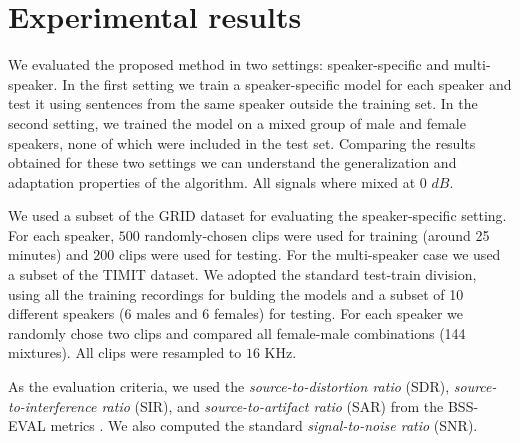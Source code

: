 \section{Experimental results}
\label{sec:experiments}


 We evaluated the proposed method in two settings: speaker-specific and multi-speaker. In the first setting 
we train a speaker-specific model for each speaker and test it using sentences from the same speaker outside the training set. 
In the second setting, we trained the model on a mixed group of male and female speakers, none of which were included in the test set.
Comparing the results obtained for these two settings we can understand the generalization and adaptation properties of the algorithm. 
All signals where mixed at 0 $dB$.

 We used a subset of the GRID dataset \cite{cooke2006audio} for evaluating the speaker-specific setting.
For each speaker, $500$ randomly-chosen clips were used for training (around 25 minutes) and $200$ clips were used for testing.
For the multi-speaker case we used a subset of the TIMIT dataset. We adopted the standard test-train division, using all the training recordings for bulding the models
and a subset of 10 different speakers (6 males and 6 females) for testing. For each speaker we randomly chose two clips and compared
all female-male combinations (144 mixtures). All clips were resampled to $16$ KHz. 

 As the evaluation criteria, we used the \emph{source-to-distortion ratio} (SDR), \emph{source-to-interference ratio} (SIR), and
\emph{source-to-artifact ratio} (SAR) from the BSS-EVAL metrics \cite{vincent2006performance}. 
%
We also computed the standard \emph{signal-to-noise ratio} (SNR).
%

